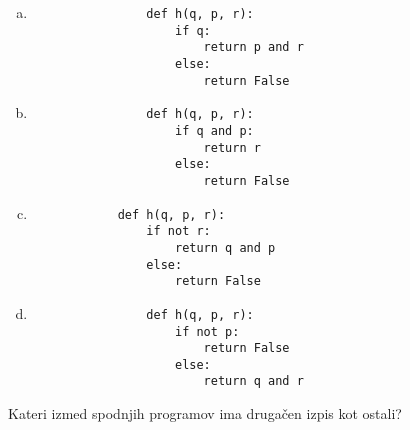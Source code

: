 \documentclass[arhiv, 10pt]{../izpit}
\begin{document}
        \begin{multicols}{2}
        \begin{enumerate}[(a)]
\item 
                \begin{verbatim}
                def h(q, p, r):
                    if q:
                        return p and r
                    else:
                        return False
                \end{verbatim}
            
\item 
                \begin{verbatim}
                def h(q, p, r):
                    if q and p:
                        return r
                    else:
                        return False
                \end{verbatim}
            
\item 
            \begin{verbatim}
            def h(q, p, r):
                if not r:
                    return q and p
                else:
                    return False
            \end{verbatim}
        
\item 
                \begin{verbatim}
                def h(q, p, r):
                    if not p:
                        return False
                    else:
                        return q and r
                \end{verbatim}
            
\end{enumerate}

        \end{multicols}
    
        \naloga*
        
        Kateri izmed spodnjih programov ima drugačen izpis kot ostali?
    
\end{document}
